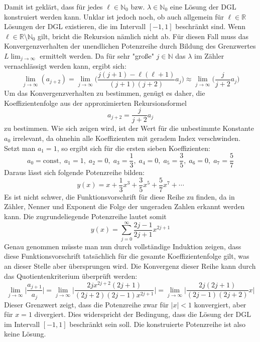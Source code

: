 \documentclass[9pt]{report}
\begin{document}
Damit ist geklärt, dass für jedes $\ell\in\mathbb{N}_0$ bzw. $\lambda\in\mathbb{N}_0$ eine Lösung der DGL konstruiert werden kann. Unklar ist jedoch noch, ob auch allgemein für $\ell\in\mathbb{R}$ Lösungen der DGL existieren, die im Intervall $[-1,1]$ beschränkt sind. Wenn $\ell\in\mathbb{R}\setminus\mathbb{N}_0$ gilt, bricht die Rekursion nämlich nicht ab. Für diesen Fall muss das Konvergenzverhalten der unendlichen Potenzreihe durch Bildung des Grenzwertes $L\lim_{j\to\infty}$ ermittelt werden. Da für sehr "große" $j\in\mathbb{N}$ das $\lambda$ im Zähler vernachlässigt werden kann, ergibt sich:
\begin{equation}
\lim_{j\to\infty}(a_{j+2})=\lim_{j\to\infty}\Big(\frac{j(j+1)-\ell(\ell+1)}{(j+1)(j+2)}a_{j}\Big)\approx\lim_{j\to\infty}\Big(\frac{j}{j+2}a_{j}\Big)
\end{equation}
Um das Konvergenzverhalten zu bestimmen, genügt es daher, die Koeffizientenfolge aus der approximierten Rekursionsformel
\begin{equation}
a_{j+2}=\frac{j}{j+2}a_{j}
\end{equation}
zu bestimmen. Wie sich zeigen wird, ist der Wert für die unbestimmte Konstante $a_0$ irrelevant, da ohnehin alle Koeffizienten mit geradem Index verschwinden. Setzt man $a_1=1$, so ergibt sich für die ersten sieben Koeffizienten:
\begin{equation}
a_0=\mathrm{const},\;a_1=1,\;a_2=0,\;a_3=\frac{1}{3},\;a_4=0,\;a_5=\frac{3}{5},\;a_6=0,\;a_7=\frac{5}{7}
\end{equation}
Daraus lässt sich folgende Potenzreihe bilden:
\begin{equation}
y(x)=x+\frac{1}{3}x^3+\frac{3}{5}x^5+\frac{5}{7}x^7+\cdots
\end{equation}
Es ist nicht schwer, die Funktionsvorschrift für diese Reihe zu finden, da in Zähler, Nenner und Exponent die Folge der ungeraden Zahlen erkannt werden kann. Die zugrundeliegende Potenzreihe lautet somit
\begin{equation}
y(x)=\sum_{j=0}^{\infty}\frac{2j-1}{2j+1}x^{2j+1}
\end{equation}
Genau genommen müsste man nun durch vollständige Induktion zeigen, dass diese Funktionsvorschrift tatsächlich für die gesamte Koeffizientenfolge gilt, was an dieser Stelle aber übersprungen wird. Die Konvergenz dieser Reihe kann durch das Quotientenkriterium überprüft werden:
\begin{equation}
\lim_{j\to\infty}\Big\vert\frac{a_{j+1}}{a_j}\Big\vert=\lim_{j\to\infty}\bigg\vert\frac{2jx^{2j+2}(2j+1)}{(2j+2)(2j-1)x^{2j+1}}\bigg\vert=\lim_{j\to\infty}\bigg\vert\frac{2j(2j+1)}{(2j-1)(2j+2)}x\bigg\vert
\end{equation}
Dieser Grenzwert zeigt, dass die Potenzreihe zwar für $\vert x\vert<1$ konvergiert, aber für $x=1$ divergiert. Dies widerspricht der Bedingung, dass die Lösung der DGL im Intervall $[-1,1]$ beschränkt sein soll. Die konstruierte Potenzreihe ist also keine Lösung.
\end{document}
